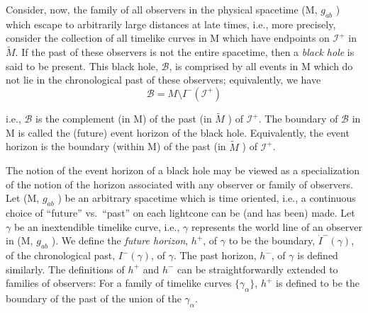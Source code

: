 \documentclass[11pt,a4paper]{article}
\begin{document}
Consider, now, the family of all observers in the physical spacetime (M, \(g_{ab}\) ) which escape to arbitrarily large distances at late times, i.e., more precisely, consider the collection of all timelike curves in M which have endpoints on \(\mathscr I^+\) in \(\widetilde M\). If the past of these \hypertarget{source-147}{} observers is not the entire spacetime, then a \emph{black hole} is said to be present. This black hole, \(\mathcal{B}\), is comprised by all events in M which do not lie in the chronological past of these observers; equivalently, we have
\begin{equation*}
\mathcal B=M\setminus I^{-}(\mathscr I^{+}) \tag{6.1.1}\label{eq:6.1.1}
\end{equation*}

i.e., \(\mathcal{B}\) is the complement (in M) of the past (in \(\widetilde{M}\) ) of \(\mathscr{I}^+\). The boundary of \(\mathcal{B}\) in M is called the (future) event horizon of the black hole. Equivalently, the event horizon is the boundary (within M) of the past (in \(\widetilde{M}\) ) of \(\mathscr{I}^+\).

The notion of the event horizon of a black hole may be viewed as a specialization of the notion of the horizon associated with any observer or family of observers. Let (M, \(g_{ab}\) ) be an arbitrary spacetime which is time oriented, i.e., a continuous choice of ``future'' vs.~``past'' on each lightcone can be (and has been) made. Let \(\gamma\) be an inextendible timelike curve, i.e., \(\gamma\) represents the world line of an observer in (M, \(g_{ab}\) ). We define the \emph{future horizon}, \(h^+\), of \(\gamma\) to be the boundary, \(\dot{I}^-(\gamma)\), of the chronological past, \(I^-(\gamma)\), of \(\gamma\). The past horizon, \(h^-\), of \(\gamma\) is defined similarly. The definitions of \(h^+\) and \(h^-\) can be straightforwardly extended to families of observers: For a family of timelike curves \(\{\gamma_{\alpha}\}\), \(h^+\) is defined to be the boundary of the past of the union of the \(\gamma_{\alpha}\).
\end{document}
